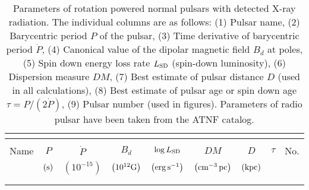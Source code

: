 
\begin{table*}
    \caption[Parameters of rotation powered normal pulsars with detected
     X-ray radiation]{
        Parameters of rotation powered normal pulsars with detected
        X-ray radiation. The individual columns are as follows: (1)
        Pulsar name, (2) Barycentric period $P$ of the pulsar,
        (3) Time derivative of barycentric period $\dot{P}$, (4)
        Canonical value of the dipolar magnetic field $B_{d}$ at poles,
        (5) Spin down energy loss rate $L_{\rm SD}$ (spin-down luminosity),
        (6) Dispersion measure $DM$, (7) Best estimate of pulsar
        distance $D$ (used in all calculations), (8) Best estimate of
        pulsar age or spin down age $\tau=P/\left(2\dot{P}\right)$,
        (9) Pulsar number (used in figures). Parameters of radio pulsar
        have been taken from the ATNF catalog.
        \label{tab:pulsars}
    }
    \begin{center}
    \begin{tabular}{|l|c|c|c|c|c|c|c|c|}
        \multicolumn{9}{c}{} \\
        \hline
        & & & & & & & & \\
        Name    &   $P$   &   $\dot{P}$   &   $B_d$   &  $\log L_{\rm SD}$  &   $DM$   &   $D$   &   $\tau$  &   No.  \\
         &   {\scriptsize $\left ( {\rm s} \right )$}   &   {\scriptsize $\left ( 10^{-15} \right )$}   &   {\scriptsize $\left ( 10^{12}{\rm G} \right )$}   &   {\scriptsize $\left ( {\rm erg \, s^{-1}} \right )$}   &   {\scriptsize $\left ( {\rm cm^{-3}\,pc} \right )$}   &   {\scriptsize $\left ({\rm kpc} \right )$}   &   &  \\
        & & & & & & & & \\
        \hline
        \hline
             
        & & & & & & & & \\
            

\end{tabular}
\end{center}
\end{table*}
